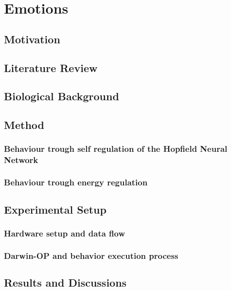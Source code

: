\documentclass[a4,12pt]{ozu-thesis}
\begin{document}
\chapter{Emotions}
\section{Motivation}


\section{Literature Review}

\section{Biological Background}

\section{Method}

\subsection{Behaviour trough self regulation of the Hopfield Neural Network}

\subsection{Behaviour trough energy regulation}


\section{Experimental Setup}

\subsection{Hardware setup and data flow}

\subsection{Darwin-OP and behavior execution process}

\section{Results and Discussions}

\end{document}
